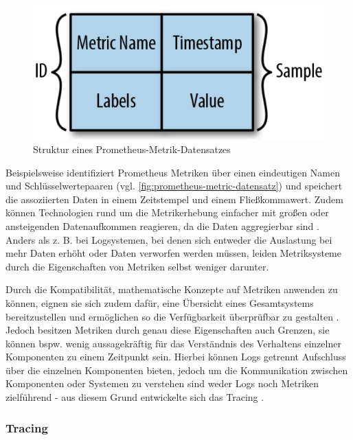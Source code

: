 \begin{figure}
\centering
\includegraphics[width=\linewidth]{img/03_methoden/prometheus-metric-sample.png}
\caption{Struktur eines Prometheus-Metrik-Datensatzes \cite{DistributedSystemsObservability}}
\label{fig:prometheus-metric-datensatz}
\end{figure}

Beispielsweise identifiziert Prometheus \cite{Prometheus} Metriken über einen eindeutigen Namen und Schlüsselwertepaaren (vgl. \autoref{fig:prometheus-metric-datensatz}) und speichert die assoziierten Daten in einem Zeitstempel und einem Fließkommawert. Zudem können Technologien rund um die Metrikerhebung einfacher mit großen oder ansteigenden Datenaufkommen reagieren, da die Daten aggregierbar sind \cite{DistributedSystemsObservability}. Anders als z. B. bei Logsystemen, bei denen sich entweder die Auslastung bei mehr Daten erhöht oder Daten verworfen werden müssen, leiden Metriksysteme durch die Eigenschaften von Metriken selbst weniger darunter.

Durch die Kompatibilität, mathematische Konzepte auf Metriken anwenden zu können, eignen sie sich zudem dafür, eine Übersicht eines Gesamtsystems bereitzustellen und ermöglichen so die Verfügbarkeit überprüfbar zu gestalten \cite{MultilevelObservabilityInCloudOrchestration} \cite{DistributedSystemsObservability}. Jedoch besitzen Metriken durch genau diese Eigenschaften auch Grenzen, sie können bspw. wenig aussagekräftig für das Verständnis des Verhaltens einzelner Komponenten zu einem Zeitpunkt sein. Hierbei können Logs getrennt Aufschluss über die einzelnen Komponenten bieten, jedoch um die Kommunikation zwischen Komponenten oder Systemen zu verstehen sind weder Logs noch Metriken zielführend - aus diesem Grund entwickelte sich das Tracing \cite{MultilevelObservabilityInCloudOrchestration} \cite{DistributedSystemsObservability}.

\subsubsection{Tracing}
\label{sec:tracing}

